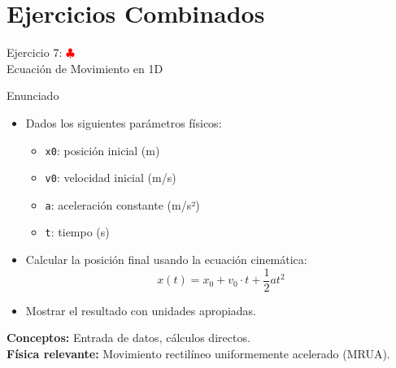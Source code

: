 \documentclass[10pt]{beamer}
\begin{document}
\section{Ejercicios Combinados}

\begin{frame}{Ejercicio 7: \hfill \textcolor{red}{$\clubsuit$} \\ Ecuación de Movimiento en 1D}
  \begin{block}{Enunciado}
    \begin{itemize}
      \item Dados los siguientes parámetros físicos:
        \begin{itemize}
          \item \texttt{x0}: posición inicial (m)
          \item \texttt{v0}: velocidad inicial (m/s)
          \item \texttt{a}: aceleración constante (m/s²)
          \item \texttt{t}: tiempo (s)
        \end{itemize}
      \item Calcular la posición final usando la ecuación cinemática:
        \[
          x(t) = x_0 + v_0 \cdot t + \frac{1}{2} a t^2
        \]
      \item Mostrar el resultado con unidades apropiadas.
    \end{itemize}
  \end{block}
  
  \textbf{Conceptos:} Entrada de datos, cálculos directos.
  \\
  \textbf{Física relevante:} Movimiento rectilíneo uniformemente acelerado (MRUA).
\end{frame}
\end{document}
